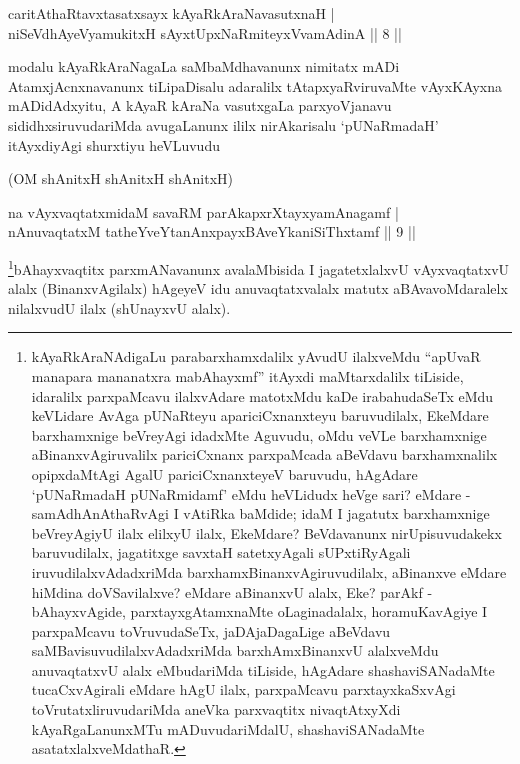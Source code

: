\begin{shl}
caritAthaRtavxtasatxsayx kAyaRkAraNavasutxnaH  | \\
niSeVdhAyeVyamukitxH sAyxtUpxNaRmiteyxVvamAdinA \hfill||  8 ||  
\end{shl}

\begin{artha}
modalu kAyaRkAraNagaLa saMbaMdhavanunx nimitatx mADi AtamxjAcnxnavanunx tiLipaDisalu adaralilx tAtapxyaRviruvaMte vAyxKAyxna mADidAdxyitu, A kAyaR kAraNa vasutxgaLa parxyoVjanavu sididhxsiruvudariMda avugaLanunx ililx nirAkarisalu `pUNaRmadaH' itAyxdiyAgi shurxtiyu heVLuvudu \mdash 
\end{artha}

\begin{center}
(OM shAnitxH shAnitxH shAnitxH)
\end{center}


\begin{shl}
na vAyxvaqtatxmidaM savaRM parAkapxrXtayxyamAnagamf  | \\
nAnuvaqtatxM tatheYveYtanAnxpayxBAveYkaniSiThxtamf \hfill||  9 ||  
\end{shl}

\begin{artha}
\footnote{kAyaRkAraNAdigaLu parabarxhamxdalilx yAvudU ilalxveMdu ``apUvaR manapara mananatxra mabAhayxmf'' itAyxdi maMtarxdalilx tiLiside, idaralilx parxpaMcavu ilalxvAdare matotxMdu kaDe irabahudaSeTx eMdu keVLidare AvAga pUNaRteyu apariciCxnanxteyu baruvudilalx, EkeMdare barxhamxnige beVreyAgi idadxMte Aguvudu, oMdu veVLe barxhamxnige aBinanxvAgiruvalilx pariciCxnanx parxpaMcada aBeVdavu barxhamxnalilx opipxdaMtAgi AgalU pariciCxnanxteyeV baruvudu, hAgAdare `pUNaRmadaH pUNaRmidamf' eMdu heVLidudx heVge sari? eMdare - samAdhAnAthaRvAgi I vAtiRka baMdide; idaM I jagatutx barxhamxnige beVreyAgiyU ilalx elilxyU ilalx, EkeMdare? BeVdavanunx nirUpisuvudakekx baruvudilalx, jagatitxge savxtaH satetxyAgali sUPxtiRyAgali iruvudilalxvAdadxriMda barxhamxBinanxvAgiruvudilalx, aBinanxve eMdare hiMdina doVSavilalxve? eMdare aBinanxvU alalx, Eke? parAkf - bAhayxvAgide, parxtayxgAtamxnaMte oLaginadalalx, horamuKavAgiye I parxpaMcavu toVruvudaSeTx, jaDAjaDagaLige aBeVdavu saMBavisuvudilalxvAdadxriMda barxhAmxBinanxvU alalxveMdu anuvaqtatxvU alalx eMbudariMda tiLiside, hAgAdare shashaviSANadaMte tucaCxvAgirali eMdare hAgU ilalx, parxpaMcavu parxtayxkaSxvAgi toVrutatxliruvudariMda aneVka parxvaqtitx nivaqtAtxyXdi kAyaRgaLanunxMTu mADuvudariMdalU, shashaviSANadaMte asatatxlalxveMdathaR.}bAhayxvaqtitx parxmANavanunx avalaMbisida I jagatetxlalxvU vAyxvaqtatxvU alalx (BinanxvAgilalx) hAgeyeV idu anuvaqtatxvalalx matutx aBAvavoMdaralelx nilalxvudU ilalx (shUnayxvU alalx).
\end{artha}


